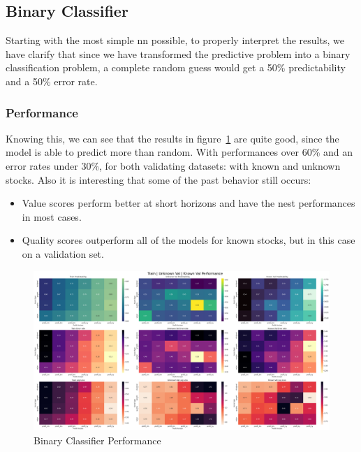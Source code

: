\documentclass[11pt,english,a4paper,hidelinks]{book}
\begin{document}
\subsection{Binary Classifier}

\noindent Starting with the most simple \acrshort{nn} possible, to properly interpret the results, we have clarify that since we have transformed the predictive problem into a binary classification problem, a complete random guess would get a 50\% predictability and a 50\% error rate.

\subsubsection{Performance}
Knowing this, we can see that the results in figure~\ref{fig:binary_classifier} are quite good, since the model is able to predict more than random. With performances over 60\% and an error rates under 30\%, for both validating datasets: with known and unknown stocks. Also it is interesting that some of the past behavior still occurs:
\begin{itemize}
    \item Value scores perform better at short horizons and have the nest performances in most cases.
    \item Quality scores outperform all of the models for known stocks, but in this case on a validation set.
\end{itemize}

\begin{figure}[H]
    \centering
    \includegraphics[width=1\textwidth]{images/code/models/neural_network/binary_classifier_nn/Big Data future - IF HARD Balanced/performance summary.png}
    \caption{Binary Classifier Performance}
    \label{fig:binary_classifier}
\end{figure}
\end{document}
